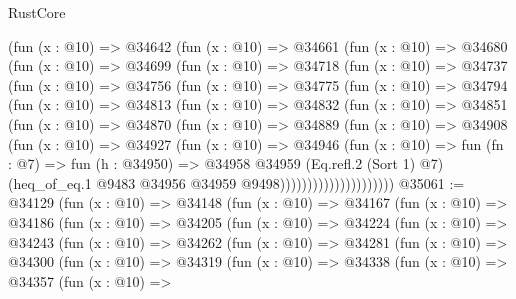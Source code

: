 \begin{lexlean}{RustCore}
\begin{coremodule}
        (fun (x : @10) =>
        @34642
          (fun (x : @10) =>
          @34661
            (fun (x : @10) =>
            @34680
              (fun (x : @10) =>
              @34699
                (fun (x : @10) =>
                @34718
                  (fun (x : @10) =>
                  @34737
                    (fun (x : @10) =>
                    @34756
                      (fun (x : @10) =>
                      @34775
                        (fun (x : @10) =>
                        @34794
                          (fun (x : @10) =>
                          @34813
                            (fun (x : @10) =>
                            @34832
                              (fun (x : @10) =>
                              @34851
                                (fun (x : @10) =>
                                @34870
                                  (fun (x : @10) =>
                                  @34889
                                    (fun (x : @10) =>
                                    @34908
                                      (fun (x : @10) =>
                                      @34927
                                        (fun (x : @10) =>
                                        @34946
                                          (fun (x : @10) =>
                                          fun (fn : @7) =>
                                          fun (h : @34950) =>
                                          @34958
                                            @34959
                                            (Eq.refl.{2} (Sort 1) @7)
                                            (heq_of_eq.{1}
                                              @9483
                                              @34956
                                              @34959
                                              @9498)))))))))))))))))))))
@35061 := @34129
    (fun (x : @10) =>
    @34148
      (fun (x : @10) =>
      @34167
        (fun (x : @10) =>
        @34186
          (fun (x : @10) =>
          @34205
            (fun (x : @10) =>
            @34224
              (fun (x : @10) =>
              @34243
                (fun (x : @10) =>
                @34262
                  (fun (x : @10) =>
                  @34281
                    (fun (x : @10) =>
                    @34300
                      (fun (x : @10) =>
                      @34319
                        (fun (x : @10) =>
                        @34338
                          (fun (x : @10) =>
                          @34357
                            (fun (x : @10) =>

\end{coremodule}
\end{lexlean}
